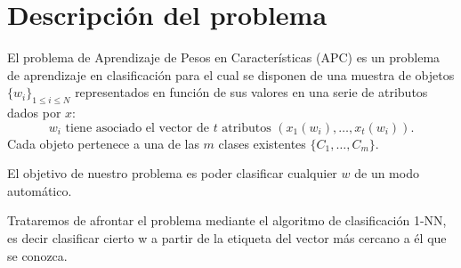 
\section{Descripción del problema}  

El problema de Aprendizaje de Pesos en Características (APC) es un problema de aprendizaje en clasificación para el cual se disponen de una muestra de objetos $\{w_i\}_{1 \leq i \leq N}$ 
representados en función de sus valores en una serie de atributos dados por $x$:
\begin{equation*}
    w_i \text{ tiene asociado el vector de $t$ atributos } (x_1(w_i), \ldots, x_t(w_i)).
\end{equation*}
Cada objeto pertenece a una de las $m$ clases existentes 
$\{C_1, \ldots, C_m\}$.

El objetivo de nuestro problema es poder clasificar cualquier $w$ de un modo automático.

Trataremos de afrontar el problema mediante el algoritmo de clasificación 1-NN, es decir clasificar cierto w a partir de la etiqueta del vector más cercano a él que se conozca.